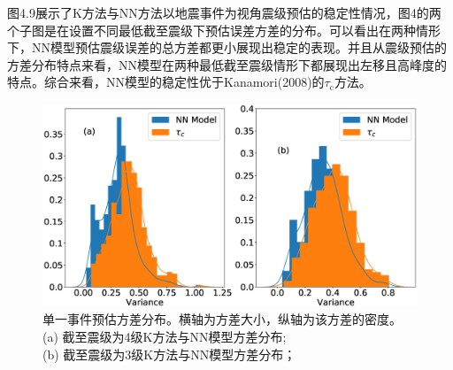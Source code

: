 \indent 图4.9展示了K方法与NN方法以地震事件为视角震级预估的稳定性情况，图4的两个子图是在设置不同最低截至震级下预估误差方差的分布。可以看出在两种情形下，NN模型预估震级误差的总方差都更小展现出稳定的表现。并且从震级预估的方差分布特点来看，NN模型在两种最低截至震级情形下都展现出左移且高峰度的特点。综合来看，NN模型的稳定性优于Kanamori(2008)的$\tau_{\mathrm{c}}$方法。\\
\begin{figure}[!h]%
	\centering  %
	\includegraphics[width=\linewidth]{img/9.eps}  %
	\caption{单一事件预估方差分布。横轴为方差大小，纵轴为该方差的密度。\\
(a) 截至震级为4级K方法与NN模型方差分布;\\
(b) 截至震级为3级K方法与NN模型方差分布；\\}  %
	\label{fig:mcmthesis-logo}   %
\end{figure}
